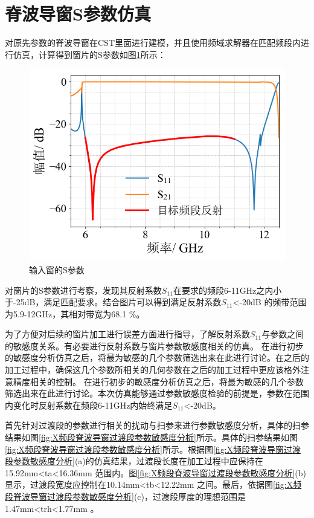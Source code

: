 \documentclass[master]{thesis-uestc}
\begin{document}
\section{脊波导窗S参数仿真}\label{sec:脊波导窗S参数仿真}
对原先参数的脊波导窗在CST里面进行建模，并且使用频域求解器在匹配频段内进行仿真，计算得到窗片的S参数如图\ref{fig:输入窗的S参数}所示：

\begin{figure}[!htb]
    \centering
    \includegraphics[width=0.6\linewidth]{pic/chapter3/脊波导窗S参数.png}
    \caption{输入窗的S参数}
    \label{fig:输入窗的S参数}
\end{figure}
对窗片的S参数进行考察，发现其反射系数$S_{11}$在要求的频段6-11GHz之内小于-25dB，满足匹配要求。结合图片可以得到满足反射系数$S_{11}$<-20dB 的频带范围为5.9-12GHz，其相对带宽为68.1 \%。

为了方便对后续的窗片加工进行误差方面进行指导，了解反射系数\(S_{11}\)与参数之间的敏感度关系。有必要进行反射系数与窗片参数敏感度相关的仿真。
在进行初步的敏感度分析仿真之后，将最为敏感的几个参数筛选出来在此进行讨论。在之后的加工过程中，确保这几个参数所相关的几何参数在之后的加工过程中更应该格外注意精度相关的控制。
在进行初步的敏感度分析仿真之后，将最为敏感的几个参数筛选出来在此进行讨论。本次仿真能够通过参数敏感度检验的前提是，参数在范围内变化时反射系数在频段6-11GHz内始终满足\(S_{11}\)<-20dB。

首先针对过渡段的参数进行相关的扰动与扫参来进行参数敏感度分析，具体的扫参结果如图\ref{fig:X频段脊波导窗过渡段参数敏感度分析}所示。具体的扫参结果如图\ref{fig:X频段脊波导窗过渡段参数敏感度分析}所示。根据图\ref{fig:X频段脊波导窗过渡段参数敏感度分析}(a)的仿真结果，过渡段长度在加工过程中应保持在15.92mm<ta<16.36mm 范围内。图\ref{fig:X频段脊波导窗过渡段参数敏感度分析}(b)显示，过渡段宽度应控制在10.14mm<tb<12.22mm 之间。最后，依据图\ref{fig:X频段脊波导窗过渡段参数敏感度分析}(c)，过渡段厚度的理想范围是1.47mm<trh<1.77mm 。
\end{document}
